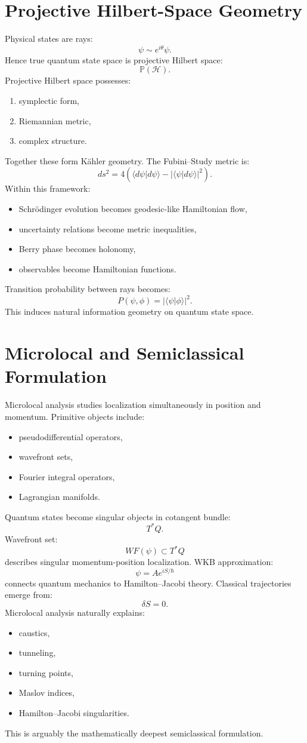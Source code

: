 \section{Projective Hilbert-Space Geometry}
\label{qmf:pr}
Physical states are rays:
\[\psi \sim e^{i\theta}\psi.\]
Hence true quantum state space is projective Hilbert space:
\[\mathbb P(\mathcal H).\]
Projective Hilbert space possesses:
\begin{enumerate}
\item symplectic form,
\item Riemannian metric,
\item complex structure.
\end{enumerate}
Together these form K\"ahler geometry.
The Fubini--Study metric is:
\[ds^2=4\left(\langle d\psi|d\psi\rangle-
|\langle \psi|d\psi\rangle|^2\right).\]
Within this framework:
\begin{itemize}
\item Schr\"odinger evolution becomes geodesic-like Hamiltonian flow,
\item uncertainty relations become metric inequalities,
\item Berry phase becomes holonomy,
\item observables become Hamiltonian functions.
\end{itemize}
Transition probability between rays becomes:
\[P(\psi,\phi)=|\langle \psi|\phi\rangle|^2.\]
This induces natural information geometry on quantum state space.

\section{Microlocal and Semiclassical Formulation}
\label{qmf:ml}
Microlocal analysis studies localization simultaneously in position and momentum.
Primitive objects include:
\begin{itemize}
\item pseudodifferential operators,
\item wavefront sets,
\item Fourier integral operators,
\item Lagrangian manifolds.
\end{itemize}
Quantum states become singular objects in cotangent bundle:
\[T^*Q.\]
Wavefront set:
\[WF(\psi)\subset T^*Q\]
describes singular momentum-position localization.
WKB approximation:
\[\psi=A e^{i S/ \hbar}\]
connects quantum mechanics to Hamilton--Jacobi theory.
Classical trajectories emerge from:
\[\delta S = 0.\]
Microlocal analysis naturally explains:
\begin{itemize}
\item caustics,
\item tunneling,
\item turning points,
\item Maslov indices,
\item Hamilton--Jacobi singularities.
\end{itemize}
This is arguably the mathematically deepest semiclassical formulation.


